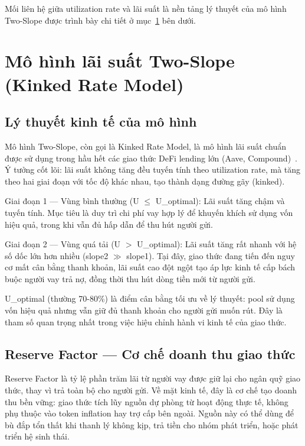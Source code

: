 \documentclass[../DoAn.tex]{subfiles}
\begin{document}
Mối liên hệ giữa utilization rate và lãi suất là nền tảng lý thuyết của mô hình Two-Slope được trình bày chi tiết ở mục~\ref{section:3.3} bên dưới.

\section{Mô hình lãi suất Two-Slope (Kinked Rate Model)}
\label{section:3.3}


\subsection{Lý thuyết kinh tế của mô hình}


Mô hình Two-Slope, còn gọi là Kinked Rate Model, là mô hình lãi suất chuẩn được sử dụng trong hầu hết các giao thức DeFi lending lớn (Aave, Compound)~\cite{CompoundV2Docs,AaveV2Whitepaper}. Ý tưởng cốt lõi: lãi suất không tăng đều tuyến tính theo utilization rate, mà tăng theo hai giai đoạn với tốc độ khác nhau, tạo thành dạng đường gãy (kinked).

Giai đoạn 1 --- Vùng bình thường (U $\leq$ U\_optimal): Lãi suất tăng chậm và tuyến tính. Mục tiêu là duy trì chi phí vay hợp lý để khuyến khích sử dụng vốn hiệu quả, trong khi vẫn đủ hấp dẫn để thu hút người gửi.

Giai đoạn 2 --- Vùng quá tải (U $>$ U\_optimal): Lãi suất tăng rất nhanh với hệ số dốc lớn hơn nhiều (slope2 $\gg$ slope1). Tại đây, giao thức đang tiến đến nguy cơ mất cân bằng thanh khoản, lãi suất cao đột ngột tạo áp lực kinh tế cấp bách buộc người vay trả nợ, đồng thời thu hút dòng tiền mới từ người gửi.

U\_optimal (thường 70-80\%) là điểm cân bằng tối ưu về lý thuyết: pool sử dụng vốn hiệu quả nhưng vẫn giữ đủ thanh khoản cho người gửi muốn rút. Đây là tham số quan trọng nhất trong việc hiệu chỉnh hành vi kinh tế của giao thức.

\subsection{Reserve Factor --- Cơ chế doanh thu giao thức}


Reserve Factor là tỷ lệ phần trăm lãi từ người vay được giữ lại cho ngân quỹ giao thức, thay vì trả toàn bộ cho người gửi. Về mặt kinh tế, đây là cơ chế tạo doanh thu bền vững: giao thức tích lũy nguồn dự phòng từ hoạt động thực tế, không phụ thuộc vào token inflation hay trợ cấp bên ngoài. Nguồn này có thể dùng để bù đắp tổn thất khi thanh lý không kịp, trả tiền cho nhóm phát triển, hoặc phát triển hệ sinh thái.
\end{document}
